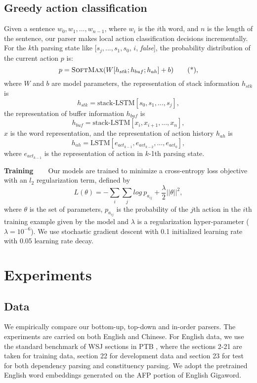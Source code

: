 \documentclass[11pt,letterpaper]{article}
\begin{document}
\subsection{Greedy action classification}
Given a sentence $w_0, w_1, ..., w_{n-1}$, where $w_i$ is the $i$th word, and $n$ is the length of the sentence, our parser makes local action classification decisions incrementally.
For the $k$th parsing state like [$s_j, ..., s_1, s_0$, $i$, \textit{false}], the probability distribution of the current action $p$ is:
\begin{equation*}
p = \textsc{SoftMax}(W[h_{stk}; h_{buf}; h_{ah}]+b)\tag{*},
\end{equation*}
where $W$ and $b$ are model parameters, the representation of stack information $h_{stk}$ is
\begin{equation*}
h_{stk} = \text{stack-LSTM}[s_0, s_1, ..., s_j],
\end{equation*}
the representation of buffer information $h_{buf}$ is
\begin{equation*}
h_{buf} = \text{stack-LSTM}[x_{i}, x_{i+1}, ..., x_{n}],
\end{equation*}
$x$ is the word representation, and the representation of action history $h_{ah}$ is
\begin{equation*}
h_{ah} = \text{LSTM}[e_{act_{k-1}}, e_{act_{k-2}}, ..., e_{act_0}],
\end{equation*}
where $e_{act_{k-1}}$ is the representation of action in $k$-1th parsing state.

\textbf{Training} ~~~
Our models are trained to minimize a cross-entropy loss objective with an $l_2$ regularization term, defined by
\begin{equation*}
L(\theta)=-\sum_i{\sum_j{log~p_{a_{ij}}}} + \frac{\lambda}{2}||\theta||^2,
\end{equation*}
where $\theta$ is the set of parameters, $p_{a_{ij}}$ is the probability of the $j$th action in the $i$th training example given by the model and $\lambda$ is a regularization hyper-parameter ($\lambda = 10^{-6}$).
We use stochastic gradient descent with 0.1 initialized learning rate with 0.05 learning rate decay.

\section{Experiments}
\subsection{Data}
We empirically compare our bottom-up, top-down and in-order parsers.
The experiments are carried on both English and Chinese.
For English data, we use the standard benchmark of WSJ sections in PTB \cite{Marcus:1993}, where the sections 2-21 are taken for training data, section 22 for development data and section 23 for test for both dependency parsing and constituency parsing.
We adopt the pretrained English word embeddings generated on the AFP portion of English Gigaword.
\end{document}

